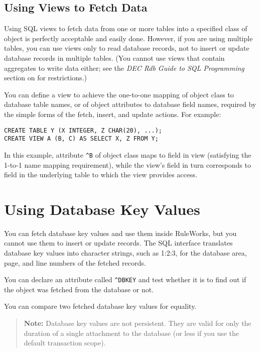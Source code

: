 \subsection{Using Views to Fetch Data}

Using SQL views to fetch data from one or more tables into a specified
class of object is perfectly acceptable and easily done. However, if
you are using multiple tables, you can use views only to read database
records, not to insert or update database records in multiple
tables. (You cannot use views that contain aggregates to write data
either; see the \emph{DEC Rdb Guide to SQL Programming} section on
 for restrictions.)

You can define a view to achieve the one-to-one mapping of object
class to database table names, or of object attributes to database
field names, required by the simple forms of the fetch, insert, and
update actions. For example:

\begin{exampl}
\begin{verbatim}
CREATE TABLE Y (X INTEGER, Z CHAR(20), ...);
CREATE VIEW A (B, C) AS SELECT X, Z FROM Y;
\end{verbatim}
\vspace{1ex}
  In this example, attribute \verb|^B| of object class  maps to
  field  in view  (satisfying the 1-to-1 name mapping
  requirement), while the view's field  in turn corresponds to
  field  in the underlying table  to which the view
  provides access.
\end{exampl}
   
\section{Using Database Key Values}

You can fetch database key values and use them inside RuleWorks, but
you cannot use them to insert or update records. The SQL interface
translates database key values into character strings, such as 1:2:3,
for the database area, page, and line numbers of the fetched records.

You can declare an attribute called \verb|^DBKEY| and test whether it
is  to find out if the object was fetched from the database or
not.

You can compare two fetched database key values for equality.

\begin{quote}
  \textbf{Note:} Database key values are not persistent.  They are
  valid for only the duration of a single attachment to the database
  (or less if you use the default transaction scope).
\end{quote}


